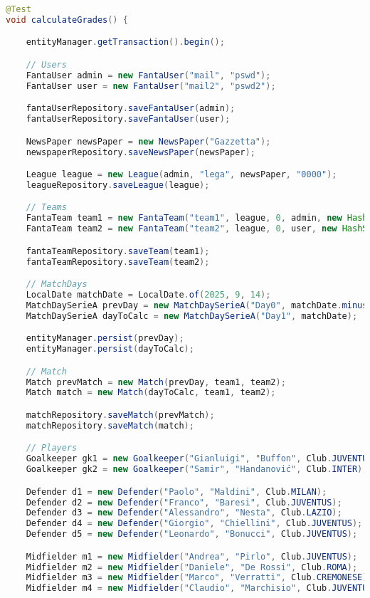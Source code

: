 \begin{lstlisting}[language=Java]
@Test
void calculateGrades() {

	entityManager.getTransaction().begin();

	// Users
	FantaUser admin = new FantaUser("mail", "pswd");
	FantaUser user = new FantaUser("mail2", "pswd2");

	fantaUserRepository.saveFantaUser(admin);
	fantaUserRepository.saveFantaUser(user);

	NewsPaper newsPaper = new NewsPaper("Gazzetta");
	newspaperRepository.saveNewsPaper(newsPaper);

	League league = new League(admin, "lega", newsPaper, "0000");
	leagueRepository.saveLeague(league);

	// Teams
	FantaTeam team1 = new FantaTeam("team1", league, 0, admin, new HashSet<Contract>());
	FantaTeam team2 = new FantaTeam("team2", league, 0, user, new HashSet<Contract>());

	fantaTeamRepository.saveTeam(team1);
	fantaTeamRepository.saveTeam(team2);

	// MatchDays
	LocalDate matchDate = LocalDate.of(2025, 9, 14);
	MatchDaySerieA prevDay = new MatchDaySerieA("Day0", matchDate.minusWeeks(1));
	MatchDaySerieA dayToCalc = new MatchDaySerieA("Day1", matchDate);

	entityManager.persist(prevDay);
	entityManager.persist(dayToCalc);

	// Match
	Match prevMatch = new Match(prevDay, team1, team2);
	Match match = new Match(dayToCalc, team1, team2);

	matchRepository.saveMatch(prevMatch);
	matchRepository.saveMatch(match);

	// Players
	Goalkeeper gk1 = new Goalkeeper("Gianluigi", "Buffon", Club.JUVENTUS);
	Goalkeeper gk2 = new Goalkeeper("Samir", "Handanović", Club.INTER);

	Defender d1 = new Defender("Paolo", "Maldini", Club.MILAN);
	Defender d2 = new Defender("Franco", "Baresi", Club.JUVENTUS);
	Defender d3 = new Defender("Alessandro", "Nesta", Club.LAZIO);
	Defender d4 = new Defender("Giorgio", "Chiellini", Club.JUVENTUS);
	Defender d5 = new Defender("Leonardo", "Bonucci", Club.JUVENTUS);

	Midfielder m1 = new Midfielder("Andrea", "Pirlo", Club.JUVENTUS);
    Midfielder m2 = new Midfielder("Daniele", "De Rossi", Club.ROMA);
	Midfielder m3 = new Midfielder("Marco", "Verratti", Club.CREMONESE);
	Midfielder m4 = new Midfielder("Claudio", "Marchisio", Club.JUVENTUS);


\end{lstlisting}
